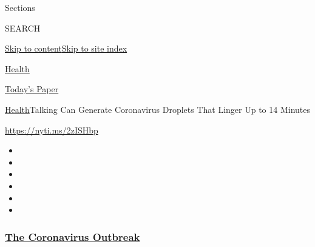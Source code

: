 Sections

SEARCH

\protect\hyperlink{site-content}{Skip to
content}\protect\hyperlink{site-index}{Skip to site index}

\href{https://www.nytimes3xbfgragh.onion/section/health}{Health}

\href{https://myaccount.nytimes3xbfgragh.onion/auth/login?response_type=cookie\&client_id=vi}{}

\href{https://www.nytimes3xbfgragh.onion/section/todayspaper}{Today's
Paper}

\href{/section/health}{Health}\textbar{}Talking Can Generate Coronavirus
Droplets That Linger Up to 14 Minutes

\url{https://nyti.ms/2zISHbp}

\begin{itemize}
\item
\item
\item
\item
\item
\item
\end{itemize}

\hypertarget{the-coronavirus-outbreak}{%
\subsubsection{\texorpdfstring{\href{https://www.nytimes3xbfgragh.onion/news-event/coronavirus?name=styln-coronavirus-national\&region=TOP_BANNER\&block=storyline_menu_recirc\&action=click\&pgtype=Article\&impression_id=50fe31c0-f1cc-11ea-96a6-ef6e07581fac\&variant=undefined}{The
Coronavirus
Outbreak}}{The Coronavirus Outbreak}}\label{the-coronavirus-outbreak}}

